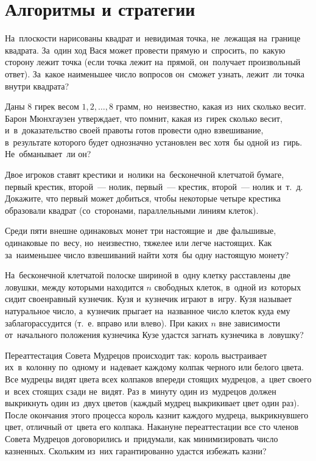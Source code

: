 
\section*{Алгоритмы и стратегии}


\begin{problems}

\item
На~плоскости нарисованы квадрат и~невидимая точка, не~лежащая на~границе
квадрата.
За~один ход Вася может провести прямую и~спросить, по~какую сторону лежит точка
(если точка лежит на~прямой, он~получает произвольный ответ).
За~какое наименьшее число вопросов он~сможет узнать, лежит~ли точка внутри
квадрата?

\item
Даны 8 гирек весом $1, 2, \ldots, 8$ грамм, но~неизвестно, какая из~них
сколько весит.
Барон Мюнхгаузен утверждает, что помнит, какая из~гирек сколько весит,
и~в~доказательство своей правоты готов провести одно взвешивание, в~результате
которого будет однозначно установлен вес хотя~бы одной из~гирь.
Не~обманывает~ли он?

\item
Двое игроков ставят крестики и~нолики на~бесконечной клетчатой бумаге, первый
крестик, второй~— нолик, первый~— крестик, второй~— нолик и~т.~д.
Докажите, что первый может добиться, чтобы некоторые четыре крестика образовали
квадрат (со~сторонами, параллельными линиям клеток).

\item
Среди пяти внешне одинаковых монет три настоящие и~две фальшивые, одинаковые
по~весу, но~неизвестно, тяжелее или легче настоящих.
Как за~наименьшее число взвешиваний найти хотя~бы одну настоящую монету?

\item
На~бесконечной клетчатой полоске шириной в~одну клетку расставлены две ловушки,
между которыми находится $n$ свободных клеток, в~одной из~которых сидит
своенравный кузнечик.
Кузя и~кузнечик играют в~игру.
Кузя называет натуральное число, а~кузнечик прыгает на~названное число клеток
куда ему заблагорассудится (т.~е. вправо или влево).
При каких $n$ вне зависимости от~начального положения кузнечика Кузе удастся
загнать кузнечика в~ловушку?

\item
Переаттестация Совета Мудрецов происходит так: король выстраивает их~в~колонну
по~одному и~надевает каждому колпак черного или белого цвета.
Все мудрецы видят цвета всех колпаков впереди стоящих мудрецов, а~цвет своего
и~всех стоящих сзади не~видят.
Раз в~минуту один из~мудрецов должен выкрикнуть один из~двух цветов (каждый
мудрец выкрикивает цвет один раз).
После окончания этого процесса король казнит каждого мудреца, выкрикнувшего
цвет, отличный от~цвета его колпака.
Накануне переаттестации все сто членов Совета Мудрецов договорились
и~придумали, как минимизировать число казненных.
Скольким из~них гарантированно удастся избежать казни?


\end{problems}
